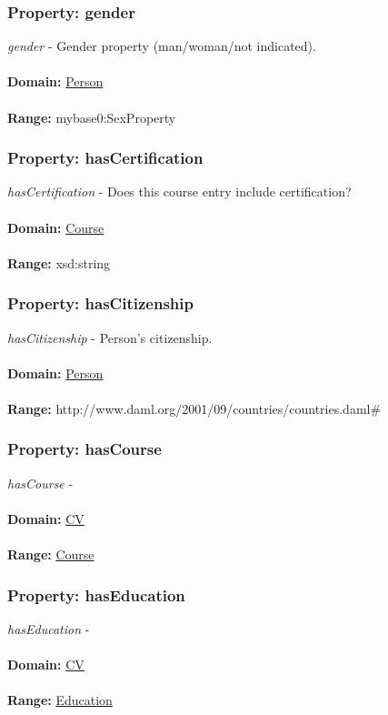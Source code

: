 \documentclass[a4paper,12pt]{article}
\numberwithin{equation}{section}
\begin{document}
\subsubsection{Property: gender}\hypertarget{gender}{}
\textit{gender} - Gender property (man/woman/not indicated).
\\\\
\textbf{Domain:} \hyperlink{Person}{Person} 
\\\\
\textbf{Range:}  mybase0:SexProperty

\subsubsection{Property: hasCertification}\hypertarget{hasCertification}{}
\textit{hasCertification} - Does this course entry include certification?
\\\\
\textbf{Domain:} \hyperlink{Course}{Course} 
\\\\
\textbf{Range:}  xsd:string

\subsubsection{Property: hasCitizenship}\hypertarget{hasCitizenship}{}
\textit{hasCitizenship} - Person's citizenship.
\\\\
\textbf{Domain:} \hyperlink{Person}{Person} 
\\\\
\textbf{Range:}  http://www.daml.org/2001/09/countries/countries.daml\#

\subsubsection{Property: hasCourse}\hypertarget{hasCourse}{}
\textit{hasCourse} - 
\\\\
\textbf{Domain:} \hyperlink{CV}{CV} 
\\\\
\textbf{Range:}  \hyperlink{Course}{Course} 

\subsubsection{Property: hasEducation}\hypertarget{hasEducation}{}
\textit{hasEducation} - 
\\\\
\textbf{Domain:} \hyperlink{CV}{CV} 
\\\\
\textbf{Range:}  \hyperlink{Education}{Education} 
\end{document}
